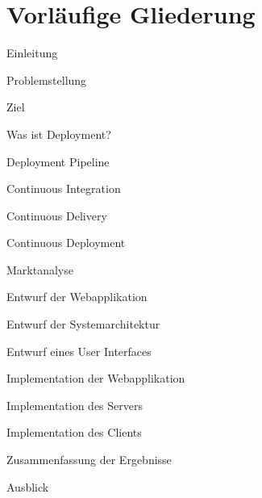 \documentclass{scrartcl}
\begin{document}
\section{Vorläufige Gliederung}
\label{sec:gliederung}

\begin{tocpreview}
  \item Einleitung
    \begin{tocpreview}
      \item Problemstellung
      \item Ziel
    \end{tocpreview}
  \item Was ist Deployment?
    \begin{tocpreview}
      \item Deployment Pipeline
      \item Continuous Integration
      \item Continuous Delivery
      \item Continuous Deployment
    \end{tocpreview}
  \item Marktanalyse
  \item Entwurf der Webapplikation
    \begin{tocpreview}
      \item Entwurf der Systemarchitektur
      \item Entwurf eines User Interfaces
    \end{tocpreview}
  \item Implementation der Webapplikation
    \begin{tocpreview}
      \item Implementation des Servers
      \item Implementation des Clients
    \end{tocpreview}
  \item Zusammenfassung der Ergebnisse
  \item Ausblick
\end{tocpreview}




\end{document}
